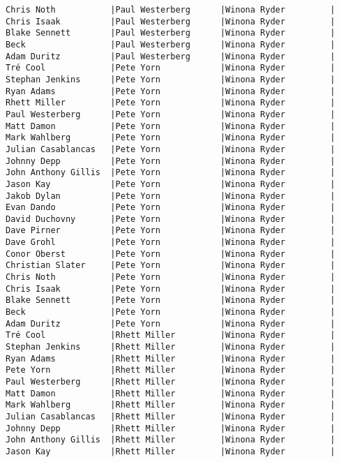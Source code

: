 \documentclass{article}
\begin{document}
\begin{verbatim}
Chris Noth           |Paul Westerberg      |Winona Ryder         |
Chris Isaak          |Paul Westerberg      |Winona Ryder         |
Blake Sennett        |Paul Westerberg      |Winona Ryder         |
Beck                 |Paul Westerberg      |Winona Ryder         |
Adam Duritz          |Paul Westerberg      |Winona Ryder         |
Tré Cool             |Pete Yorn            |Winona Ryder         |
Stephan Jenkins      |Pete Yorn            |Winona Ryder         |
Ryan Adams           |Pete Yorn            |Winona Ryder         |
Rhett Miller         |Pete Yorn            |Winona Ryder         |
Paul Westerberg      |Pete Yorn            |Winona Ryder         |
Matt Damon           |Pete Yorn            |Winona Ryder         |
Mark Wahlberg        |Pete Yorn            |Winona Ryder         |
Julian Casablancas   |Pete Yorn            |Winona Ryder         |
Johnny Depp          |Pete Yorn            |Winona Ryder         |
John Anthony Gillis  |Pete Yorn            |Winona Ryder         |
Jason Kay            |Pete Yorn            |Winona Ryder         |
Jakob Dylan          |Pete Yorn            |Winona Ryder         |
Evan Dando           |Pete Yorn            |Winona Ryder         |
David Duchovny       |Pete Yorn            |Winona Ryder         |
Dave Pirner          |Pete Yorn            |Winona Ryder         |
Dave Grohl           |Pete Yorn            |Winona Ryder         |
Conor Oberst         |Pete Yorn            |Winona Ryder         |
Christian Slater     |Pete Yorn            |Winona Ryder         |
Chris Noth           |Pete Yorn            |Winona Ryder         |
Chris Isaak          |Pete Yorn            |Winona Ryder         |
Blake Sennett        |Pete Yorn            |Winona Ryder         |
Beck                 |Pete Yorn            |Winona Ryder         |
Adam Duritz          |Pete Yorn            |Winona Ryder         |
Tré Cool             |Rhett Miller         |Winona Ryder         |
Stephan Jenkins      |Rhett Miller         |Winona Ryder         |
Ryan Adams           |Rhett Miller         |Winona Ryder         |
Pete Yorn            |Rhett Miller         |Winona Ryder         |
Paul Westerberg      |Rhett Miller         |Winona Ryder         |
Matt Damon           |Rhett Miller         |Winona Ryder         |
Mark Wahlberg        |Rhett Miller         |Winona Ryder         |
Julian Casablancas   |Rhett Miller         |Winona Ryder         |
Johnny Depp          |Rhett Miller         |Winona Ryder         |
John Anthony Gillis  |Rhett Miller         |Winona Ryder         |
Jason Kay            |Rhett Miller         |Winona Ryder         |

\end{verbatim}
\end{document}
